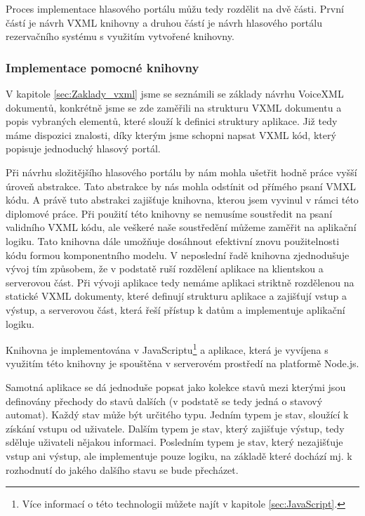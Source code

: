 \documentclass[ing,male,java,dept460]{diploma}						%
\begin{document}
Proces implementace hlasového portálu můžu tedy rozdělit na dvě části. První částí je návrh VXML knihovny a druhou částí je návrh hlasového portálu rezervačního systému s využitím vytvořené knihovny.

\subsubsection{Implementace pomocné knihovny}

V kapitole \ref{sec:Zaklady_vxml} jsme se seznámili se základy návrhu VoiceXML dokumentů, konkrétně jsme se zde zaměřili na strukturu VXML dokumentu a popis vybraných elementů, které slouží k definici struktury aplikace. Již tedy máme dispozici znalosti, díky kterým jsme schopni napsat VXML kód, který popisuje jednoduchý hlasový portál.

Při návrhu složitějšího hlasového portálu by nám mohla ušetřit hodně práce vyšší úroveň abstrakce. Tato abstrakce by nás mohla odstínit od přímého psaní VMXL kódu. A právě tuto abstrakci zajišťuje knihovna, kterou jsem vyvinul v rámci této diplomové práce. Při použití této knihovny se nemusíme soustředit na psaní validního VXML kódu, ale veškeré naše soustředění můžeme zaměřit na aplikační logiku. Tato knihovna dále umožňuje dosáhnout efektivní znovu použitelnosti kódu formou komponentního modelu. V neposlední řadě knihovna zjednodušuje vývoj tím způsobem, že v podstatě ruší rozdělení aplikace na klientskou a serverovou část. Při vývoji aplikace tedy nemáme aplikaci striktně rozdělenou na statické VXML dokumenty, které definují strukturu aplikace a zajišťují vstup a výstup, a serverovou část, která řeší přístup k datům a implementuje aplikační logiku.

Knihovna je implementována v JavaScriptu\footnote{Více informací o této technologii můžete najít v kapitole \ref{sec:JavaScript}.} a aplikace, která je vyvíjena s využitím této knihovny je spouštěna v serverovém prostředí na platformě Node.js.

Samotná aplikace se dá jednoduše popsat jako kolekce stavů mezi kterými jsou definovány přechody do stavů dalších (v podstatě se tedy jedná o stavový automat). Každý stav může být určitého typu. Jedním typem je stav, sloužící k získání vstupu od uživatele. Dalším typem je stav, který zajišťuje výstup, tedy sděluje uživateli nějakou informaci. Posledním typem je stav, který nezajišťuje vstup ani výstup, ale implementuje pouze logiku, na základě které dochází mj. k rozhodnutí do jakého dalšího stavu se bude přecházet.
\end{document}

